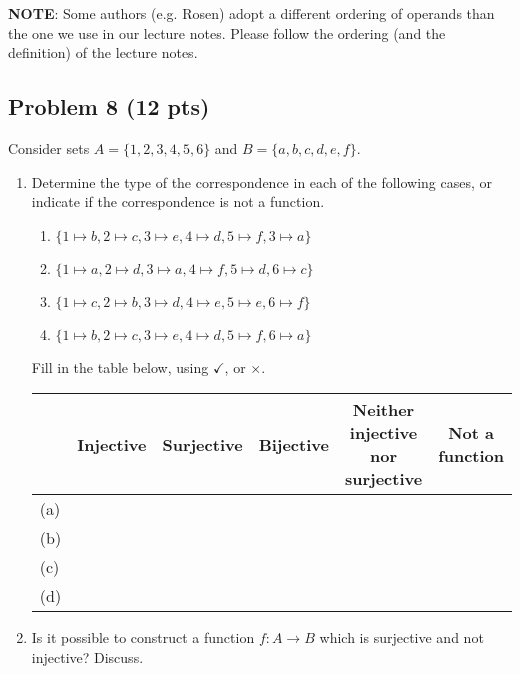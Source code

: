 \documentclass[12pt]{article}
\begin{document}
\noindent \textbf{NOTE}: Some authors (e.g. Rosen) adopt a different ordering of operands than the one we use in our lecture notes. Please follow the ordering (and the definition) of the lecture notes.

\newpage


\subsection{Problem 8 (12 pts)}

Consider sets $A = \{1, 2, 3, 4, 5, 6 \}$ and $B = \{ a, b, c, d, e, f \}$.

\begin{enumerate}

\item Determine the type of the correspondence in each of the following cases, or indicate if the correspondence is not a function.

\begin{enumerate}
\item $\{ 1 \mapsto b, 2 \mapsto c, 3 \mapsto e, 4 \mapsto d, 5 \mapsto f, 3 \mapsto a \}$

\item $\{ 1 \mapsto a, 2 \mapsto d, 3 \mapsto a, 4 \mapsto f, 5 \mapsto d, 6 \mapsto c \}$

\item $\{ 1 \mapsto c, 2 \mapsto b, 3 \mapsto d, 4 \mapsto e, 5 \mapsto e, 6 \mapsto f  \}$

\item $\{ 1 \mapsto b, 2 \mapsto c, 3 \mapsto e, 4 \mapsto d, 5 \mapsto f, 6 \mapsto a \}$
\end{enumerate}

\noindent Fill in the table below, using $\checkmark$, or $\times$.

\begin{center}
\begin{tabular}{|l|c|c|c|c|c|}
\hline
		& Injective		& Surjective	& Bijective 	& \multicolumn{1}{m{3cm}|}{Neither injective nor surjective}	&	Not a function	\\
\hline
(a)		& 		& 		& 	& 			&  \\
\hline

(b)		& 		& 		& 		& 	&	 \\
\hline


(c)		& 		& 		& 		& 	&  \\
\hline

(d)		& 		& 		& 		&	&  \\
\hline
\end{tabular}
\end{center}


\item Is it possible to construct a function $f : A \rightarrow B$ which is surjective and not injective?  Discuss.
\end{enumerate}
\end{document}
